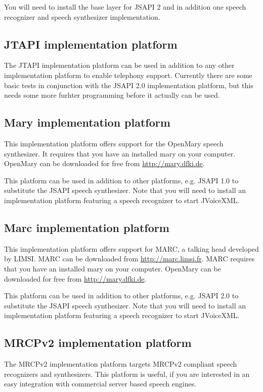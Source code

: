 \documentclass[11pt,a4paper]{book}
\begin{document}
You will need to install the base layer for JSAPI 2 and in addition one
speech recognizer and speech synthesizer implementation.

\subsection{JTAPI implementation platform}

The JTAPI implementation platform can be used in addition to any other
implementation platform to enable telephony support. Currently there are some
basic tests in conjunction with the JSAPI 2.0 implementation platform, but this
needs some more furhter programming before it actually can be used.

\subsection{Mary implementation platform}

This implementation platform offers support for the OpenMary speech synthesizer. 
It requires that you have an installed mary on your computer. OpenMary can be
downloaded for free from \url{http://mary.dfki.de}.

This platform can be used in addition to other platforms, e.g. JSAPI 1.0 to
substitute the JSAPI speech synthesizer. Note that you will need to install an
implementation platform featuring a speech recognizer to start JVoiceXML.


\subsection{Marc implementation platform}

This implementation platform offers support for MARC, a talking
head developed by LIMSI. MARC can be downloaded from 
\url{http://marc.limsi.fr}. MARC requires that you have an installed mary on your computer. OpenMary can be
downloaded for free from \url{http://mary.dfki.de}.

This platform can be used in addition to other platforms, e.g. JSAPI 2.0 to
substitute the JSAPI speech synthesizer. Note that you will need to install an
implementation platform featuring a speech recognizer to start JVoiceXML.

\subsection{MRCPv2 implementation platform}

The MRCPv2 implementation platform targets MRCPv2 compliant speech recognizers
and synthesizers. This platform is useful, if you are interested in an easy
integration with commercial server based speech engines.
\end{document}
